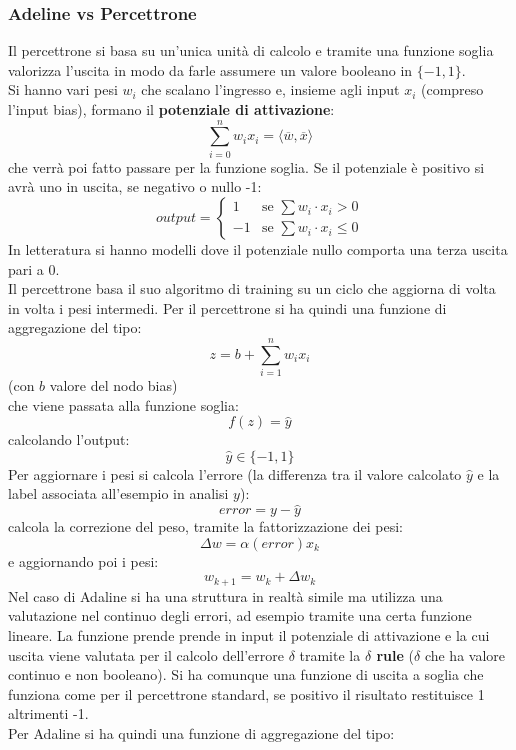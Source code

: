 					\subsubsection{Adeline vs Percettrone}
					Il percettrone si basa su un'unica unità di calcolo e tramite una funzione
					soglia valorizza l'uscita in modo da farle assumere un valore booleano in
					$\{-1, 1\}$.\\
					Si hanno vari pesi $w_i$ che scalano l'ingresso e, insieme agli input $x_i$
					(compreso l'input bias),
					formano il \textbf{potenziale di attivazione}:
					\[\sum_{i=0}^nw_ix_i=\langle \overline{w}, \overline{x}\rangle\]
					che verrà poi fatto passare per la funzione
					soglia. Se il potenziale è positivo si avrà uno in uscita, se negativo o nullo
					-1:
					\[output=
						\begin{cases}
							1  & \mbox{se } \sum w_i\cdot x_i > 0    \\
							-1 & \mbox{se } \sum w_i\cdot x_i \leq 0 
						\end{cases}
					\]
					In letteratura si hanno modelli dove il potenziale nullo comporta una terza
					uscita pari a 0.\\
					Il percettrone basa il suo algoritmo di training su un ciclo che aggiorna di
					volta in volta i pesi intermedi.
					Per il percettrone si ha quindi una funzione di aggregazione del tipo:
					\[z=b+\sum_{i=1}^nw_ix_i\]
					(con $b$ valore del nodo bias)\\
					che viene passata alla funzione soglia:
					\[f(z)=\hat{y}\]
					calcolando l'output:
					\[\hat{y}\in\{-1, 1\}\]
					Per aggiornare i pesi si calcola l'errore (la differenza tra il valore calcolato
					$\hat{y}$ e la label associata all'esempio in analisi $y$):
					\[error=y-\hat{y}\]
					calcola la correzione del peso, tramite la fattorizzazione dei pesi:
					\[\Delta w=\alpha(error)x_k\]
					e aggiornando poi i pesi:
					\[w_{k+1}=w_k+\Delta w_k\]
					Nel caso di Adaline si ha una struttura in realtà simile ma utilizza una
					valutazione nel continuo degli errori, ad esempio tramite una certa funzione
					lineare. La funzione prende prende in input il potenziale di attivazione e la
					cui uscita viene valutata per il calcolo dell'errore $\delta$ tramite la
					\textbf{$\delta$ rule} ($\delta$ che ha valore continuo e non booleano). Si ha
					comunque una funzione di uscita a soglia che funziona come per il percettrone
					standard, se positivo il risultato restituisce 1 altrimenti -1.\\
					Per Adaline si ha quindi una funzione di aggregazione del tipo:
